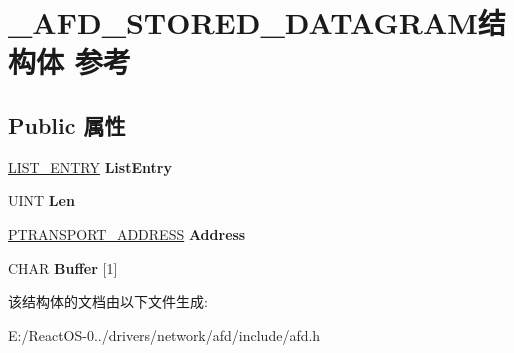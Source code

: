 \hypertarget{struct___a_f_d___s_t_o_r_e_d___d_a_t_a_g_r_a_m}{}\section{\+\_\+\+A\+F\+D\+\_\+\+S\+T\+O\+R\+E\+D\+\_\+\+D\+A\+T\+A\+G\+R\+A\+M结构体 参考}
\label{struct___a_f_d___s_t_o_r_e_d___d_a_t_a_g_r_a_m}
\subsection*{Public 属性}
\begin{DoxyCompactItemize}
\item 
\mbox{\label{struct___a_f_d___s_t_o_r_e_d___d_a_t_a_g_r_a_m_ae252546fde3a2841d9d75b027c434417}} 
\hyperlink{struct___l_i_s_t___e_n_t_r_y}{L\+I\+S\+T\+\_\+\+E\+N\+T\+RY} {\bfseries List\+Entry}
\item 
\mbox{\label{struct___a_f_d___s_t_o_r_e_d___d_a_t_a_g_r_a_m_a8c7ec10b3517f829409f39d4dac30fef}} 
U\+I\+NT {\bfseries Len}
\item 
\mbox{\label{struct___a_f_d___s_t_o_r_e_d___d_a_t_a_g_r_a_m_a06866bff8b465636d07a0b8fac6c3939}} 
\hyperlink{struct___t_r_a_n_s_p_o_r_t___a_d_d_r_e_s_s}{P\+T\+R\+A\+N\+S\+P\+O\+R\+T\+\_\+\+A\+D\+D\+R\+E\+SS} {\bfseries Address}
\item 
\mbox{\label{struct___a_f_d___s_t_o_r_e_d___d_a_t_a_g_r_a_m_a954adab51d641e6452fd3f4c81c239f4}} 
C\+H\+AR {\bfseries Buffer} \mbox{[}1\mbox{]}
\end{DoxyCompactItemize}


该结构体的文档由以下文件生成\+:\begin{DoxyCompactItemize}
\item 
E\+:/\+React\+O\+S-\/0../drivers/network/afd/include/afd.\+h\end{DoxyCompactItemize}
